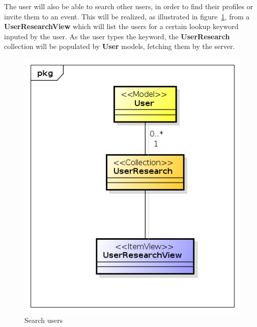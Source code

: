 The user will also be able to search other users, in order to find their profiles or invite them to an event. This will be realized, as illustrated in figure~\ref{fig:userSearchMVC}, from a \textbf{UserResearchView} which will list the users for a certain lookup keyword inputed by the user. As the user types the keyword, the \textbf{UserResearch} collection will be populated by \textbf{User} models, fetching them by the server.
\begin{center}
 \begin{figure}[H]
    \includegraphics[width=1\textwidth]{../MVCDiagram/MVCBackbone/UserSearch.png}
    \caption{Search users}
     \label{fig:userSearchMVC}
     \end{figure}
   \end{center}
   
